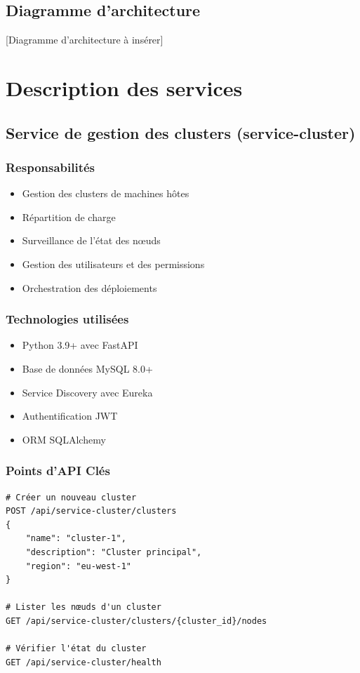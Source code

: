\documentclass[12pt,a4paper]{report}
\begin{document}
\section{Diagramme d'architecture}
\begin{center}
    [Diagramme d'architecture à insérer]
\end{center}

\chapter{Description des services}
\section{Service de gestion des clusters (service-cluster)}
\subsection{Responsabilités}
\begin{itemize}
    \item Gestion des clusters de machines hôtes
    \item Répartition de charge
    \item Surveillance de l'état des nœuds
    \item Gestion des utilisateurs et des permissions
    \item Orchestration des déploiements
\end{itemize}

\subsection{Technologies utilisées}
\begin{itemize}
    \item Python 3.9+ avec FastAPI
    \item Base de données MySQL 8.0+
    \item Service Discovery avec Eureka
    \item Authentification JWT
    \item ORM SQLAlchemy
\end{itemize}

\subsection{Points d'API Clés}
\begin{verbatim}
# Créer un nouveau cluster
POST /api/service-cluster/clusters
{
    "name": "cluster-1",
    "description": "Cluster principal",
    "region": "eu-west-1"
}

# Lister les nœuds d'un cluster
GET /api/service-cluster/clusters/{cluster_id}/nodes

# Vérifier l'état du cluster
GET /api/service-cluster/health
\end{verbatim}
\end{document}
